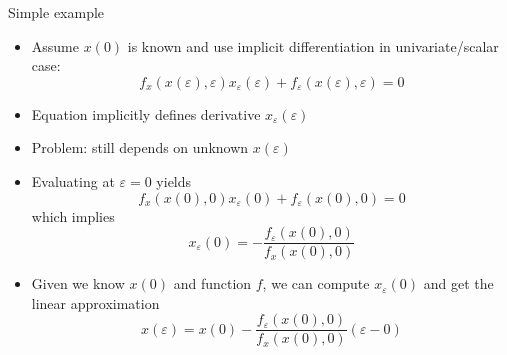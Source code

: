 \begin{frame}{Simple example}
  \begin{itemize}
    \item Assume $x(0)$ is known and use implicit differentiation in univariate/scalar case:
          \begin{equation}
            {f_x }\left( {x\left( \varepsilon  \right),\varepsilon } \right){x_\varepsilon }\left( \varepsilon  \right) + {f_\varepsilon}\left( {x\left( \varepsilon  \right),\varepsilon } \right) = 0
          \end{equation}
    \item Equation implicitly defines derivative $x_\varepsilon\left( \varepsilon  \right)$
    \item Problem: still depends on unknown $x\left( \varepsilon  \right)$
    \item Evaluating at $\varepsilon=0$ yields
          \begin{equation}
            {f_x}\left( {x\left( 0 \right),0} \right){x_\varepsilon }\left( 0 \right) + {f_\varepsilon }\left( {x\left( 0 \right),0} \right) = 0
          \end{equation}
          which implies
          \begin{equation}
            {x_\varepsilon }\left( 0 \right) =  - \frac{{{f_\varepsilon }\left( {x\left( 0 \right),0} \right)}}{{{f_x}\left( {x\left( 0 \right),0} \right)}}
          \end{equation}
    \item Given we know $x(0)$ and function $f$, we can compute $x_\varepsilon\left( 0 \right)$ and get the linear approximation
          \begin{equation}
            {x }\left( \varepsilon \right) =x(0)  - \frac{{{f_\varepsilon }\left( {x\left( 0 \right),0} \right)}}{{{f_x}\left( {x\left( 0 \right),0} \right)}}(\varepsilon-0)
          \end{equation}
  \end{itemize}
\end{frame}


